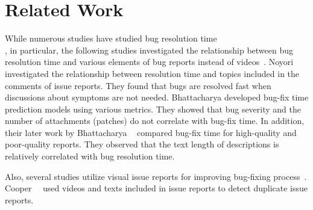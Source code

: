 \section{Related Work}
\label{sec:relate}
While numerous studies have studied bug resolution time~\citep{DBLP:conf/msr/ChenNSH14}\citep{DBLP:journals/jss/GarciaSN18}\citep{DBLP:conf/sigsoft/JeongKZ09}\\
\citep{DBLP:conf/icsm/KashiwaYKO14}\citep{DBLP:conf/msr/ZamanAH11}, 
in particular, the following studies investigated the relationship between bug resolution time and various elements of bug reports instead of videos~\citep{DBLP:conf/msr/BhattacharyaN11}\citep{DBLP:conf/csmr/BhattacharyaUNK13}\citep{DBLP:journals/ieicetd/NoyoriWFKONT21}. 
Noyori~\et~\citep{DBLP:journals/ieicetd/NoyoriWFKONT21} investigated the relationship between resolution time and topics included in the comments of issue reports. 
They found that bugs are resolved fast when discussions about symptoms are not needed.  Bhattacharya \et \citep{DBLP:conf/msr/BhattacharyaN11} developed bug-fix
time prediction models using various metrics. They showed that bug severity and the number of attachments (patches) do not correlate with bug-fix time. In addition, their later work by Bhattacharya \et~\citep{DBLP:conf/csmr/BhattacharyaUNK13} compared bug-fix time for high-quality and poor-quality reports. They observed that the text length of descriptions is relatively correlated with bug resolution time. 

Also, several studies utilize visual issue reports for improving bug-fixing process~\citep{DBLP:conf/icse/CooperBCMP21}\citep{TODO}. Cooper~\et~\citep{DBLP:conf/icse/CooperBCMP21} used videos and texts included in issue reports to detect duplicate issue reports. 